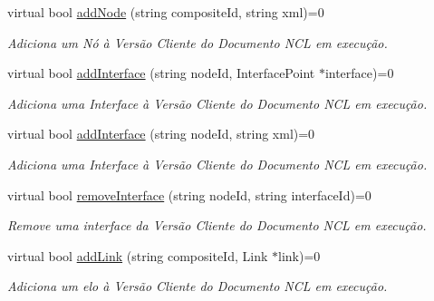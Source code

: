 \begin{DoxyCompactItemize}
virtual bool \hyperlink{classbr_1_1ufscar_1_1lince_1_1ginga_1_1wac_1_1editing_1_1IClientEditing_ad101947701dbbef3d365d92ae385ec46}{addNode} (string compositeId, string xml)=0
\begin{DoxyCompactList}\small\item\em Adiciona um Nó à Versão Cliente do Documento NCL em execução. \item\end{DoxyCompactList}\item 
virtual bool \hyperlink{classbr_1_1ufscar_1_1lince_1_1ginga_1_1wac_1_1editing_1_1IClientEditing_a7a733528927ed22d232ae58e0539b1eb}{addInterface} (string nodeId, InterfacePoint $\ast$interface)=0
\begin{DoxyCompactList}\small\item\em Adiciona uma Interface à Versão Cliente do Documento NCL em execução. \item\end{DoxyCompactList}\item 
virtual bool \hyperlink{classbr_1_1ufscar_1_1lince_1_1ginga_1_1wac_1_1editing_1_1IClientEditing_af60b6d775c412012b85a219311bbc4d8}{addInterface} (string nodeId, string xml)=0
\begin{DoxyCompactList}\small\item\em Adiciona uma Interface à Versão Cliente do Documento NCL em execução. \item\end{DoxyCompactList}\item 
virtual bool \hyperlink{classbr_1_1ufscar_1_1lince_1_1ginga_1_1wac_1_1editing_1_1IClientEditing_abe89650753eccb62bf1772cc0e87d6b7}{removeInterface} (string nodeId, string interfaceId)=0
\begin{DoxyCompactList}\small\item\em Remove uma interface da Versão Cliente do Documento NCL em execução. \item\end{DoxyCompactList}\item 
virtual bool \hyperlink{classbr_1_1ufscar_1_1lince_1_1ginga_1_1wac_1_1editing_1_1IClientEditing_a74829dbd18d200ef2522a0e228e20a10}{addLink} (string compositeId, Link $\ast$link)=0
\begin{DoxyCompactList}\small\item\em Adiciona um elo à Versão Cliente do Documento NCL em execução. \item\end{DoxyCompactList}\item 

\end{DoxyCompactItemize}
